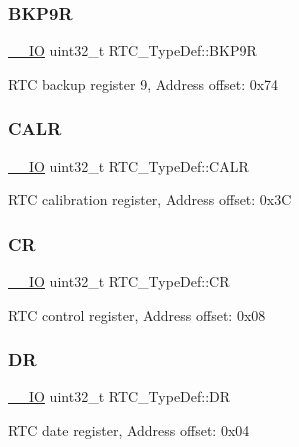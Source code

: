\subsubsection{\texorpdfstring{BKP9R}{BKP9R}}
{\footnotesize\ttfamily \mbox{\hyperlink{core__sc300_8h_aec43007d9998a0a0e01faede4133d6be}{\+\_\+\+\_\+\+IO}} uint32\+\_\+t R\+T\+C\+\_\+\+Type\+Def\+::\+B\+K\+P9R}

R\+TC backup register 9, Address offset\+: 0x74 \mbox{\label{struct_r_t_c___type_def_aea66ea813830c2f3ff207464794397a4}} 
\subsubsection{\texorpdfstring{CALR}{CALR}}
{\footnotesize\ttfamily \mbox{\hyperlink{core__sc300_8h_aec43007d9998a0a0e01faede4133d6be}{\+\_\+\+\_\+\+IO}} uint32\+\_\+t R\+T\+C\+\_\+\+Type\+Def\+::\+C\+A\+LR}

R\+TC calibration register, Address offset\+: 0x3C \mbox{\label{struct_r_t_c___type_def_a731d9209ce40dce6ea61fcc6f818c892}} 
\subsubsection{\texorpdfstring{CR}{CR}}
{\footnotesize\ttfamily \mbox{\hyperlink{core__sc300_8h_aec43007d9998a0a0e01faede4133d6be}{\+\_\+\+\_\+\+IO}} uint32\+\_\+t R\+T\+C\+\_\+\+Type\+Def\+::\+CR}

R\+TC control register, Address offset\+: 0x08 \mbox{\label{struct_r_t_c___type_def_a8750eae683cb3d382476dc7cdcd92b96}} 
\subsubsection{\texorpdfstring{DR}{DR}}
{\footnotesize\ttfamily \mbox{\hyperlink{core__sc300_8h_aec43007d9998a0a0e01faede4133d6be}{\+\_\+\+\_\+\+IO}} uint32\+\_\+t R\+T\+C\+\_\+\+Type\+Def\+::\+DR}

R\+TC date register, Address offset\+: 0x04 \mbox{\label{struct_r_t_c___type_def_a5a7b104d80b48b5708b50cdc487d6a78}} 
